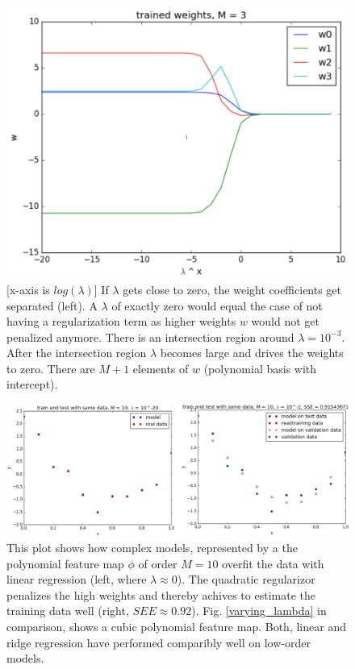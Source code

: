 \begin{figure}[!ht]
   \centering
   \includegraphics[width=0.8\linewidth]{figures/weights_separation}
   \caption{[x-axis is $log(\lambda)$] If $\lambda$ gets close to zero, the weight coefficients get separated (left). A $\lambda$ of exactly zero would equal the case of not having a regularization term as higher weights $w$ would not get penalized anymore. There is an intersection region around $\lambda=10^{-3}$. After the intersection region $\lambda$ becomes large and drives the weights to zero. There are $M+1$ elements of $w$ (polynomial basis with intercept).}
\label{weights_separation}
\end{figure}

\begin{figure}[!ht]
   \centering
   \includegraphics[width=0.9\linewidth]{figures/ridge_high_dim}
   \caption{This plot shows how complex models, represented by a the polynomial feature map $\phi$ of order $M=10$ overfit the data with linear regression (left, where $\lambda \approx 0$). The quadratic regularizor penalizes the high weights and thereby achives to estimate the training data well (right, $SEE \approx 0.92$). Fig. \ref{varying_lambda} in comparison, shows a cubic polynomial feature map. Both, linear and ridge regression have performed comparibly well on low-order models.}
\label{ridge_him_dim}
\end{figure}


